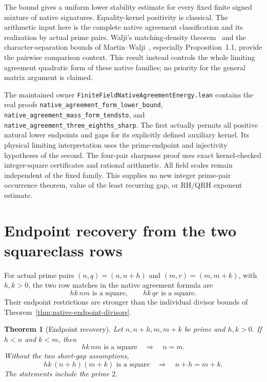 \documentclass[11pt]{article}
\newtheorem{theorem}{Theorem}[section]
\begin{document}
The bound gives a uniform lower stability estimate for every fixed finite
signed mixture of native signatures. Equality-kernel positivity is
classical. The arithmetic input here is the complete native agreement
classification and its realization by actual prime pairs.
Walji's matching-density theorem~\cite{WaljiMatchingDensities}
and the character-separation bounds of
Martin--Walji~\cite{MartinWaljiCharacters}, especially Proposition~1.1,
provide the pairwise comparison context. This result instead controls
the whole limiting agreement quadratic form of these native families;
no priority for the general matrix argument is claimed.

The maintained owner
\texttt{FiniteFieldNativeAgreementEnergy.\allowbreak lean}
contains the real proofs
\texttt{native\_agreement\_form\_lower\_bound},
\texttt{native\_agreement\_mass\_form\_tendsto}, and
\texttt{native\_agreement\_three\_eighths\_sharp}.
The first actually permits all positive natural lower endpoints and gaps
for its explicitly defined auxiliary kernel. Its physical limiting
interpretation uses the prime-endpoint and injectivity hypotheses of
the second. The four-pair sharpness proof uses exact kernel-checked
integer-square certificates and rational arithmetic.
All field scales remain independent of the fixed family.
This supplies no new integer prime-pair occurrence theorem,
value of the least recurring gap, or RH/QRH exponent estimate.

\section{Endpoint recovery from the two squareclass rows}
\label{sec:native-row-fibres}

For actual prime pairs \((n,q)=(n,n+h)\) and
\((m,r)=(m,m+k)\), with \(h,k>0\), the two row matches in the
native agreement formula are
\[
 hk\,nm\text{ is a square},\qquad hk\,qr\text{ is a square}.
\]
Their endpoint restrictions are stronger than the individual divisor
bounds of Theorem~\ref{thm:native-endpoint-divisors}.

\begin{theorem}[Endpoint recovery]
\label{thm:native-row-fibres}
Let \(n,n+h,m,m+k\) be prime and \(h,k>0\).
If \(h<n\) and \(k<m\), then
\[
 hk\,nm\text{ is a square}\quad\Longrightarrow\quad n=m.
\]
Without the two short-gap assumptions,
\[
 hk\,(n+h)(m+k)\text{ is a square}
       \quad\Longrightarrow\quad n+h=m+k.
\]
The statements include the prime \(2\).
\end{theorem}
\end{document}
